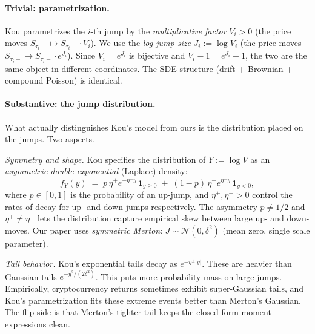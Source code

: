 \documentclass[11pt]{article}
\theoremstyle{definition}
\theoremstyle{remark}
\newcommand{\1}{\mathbf{1}}
\begin{document}
\paragraph{Trivial: parametrization.}
Kou parametrizes the $i$-th jump by the \emph{multiplicative factor} $V_i > 0$ (the price moves $S_{\tau_i-} \mapsto S_{\tau_i-} \cdot V_i$). We use the \emph{log-jump size} $J_i := \log V_i$ (the price moves $S_{\tau_i-} \mapsto S_{\tau_i-} \cdot e^{J_i}$). Since $V_i = e^{J_i}$ is bijective and $V_i - 1 = e^{J_i} - 1$, the two are the same object in different coordinates. The SDE structure (drift + Brownian + compound Poisson) is identical.

\paragraph{Substantive: the jump distribution.}
What actually distinguishes Kou's model from ours is the distribution placed on the jumps. Two aspects.

\emph{Symmetry and shape.} Kou specifies the distribution of $Y := \log V$ as an \emph{asymmetric double-exponential} (Laplace) density:
\[
f_Y(y) \;=\; p\,\eta^+ e^{-\eta^+ y}\,\mathbf{1}_{y \ge 0} \;+\; (1-p)\,\eta^- e^{\eta^- y}\,\mathbf{1}_{y < 0},
\]
where $p \in [0,1]$ is the probability of an up-jump, and $\eta^+, \eta^- > 0$ control the rates of decay for up- and down-jumps respectively. The asymmetry $p \neq 1/2$ and $\eta^+ \neq \eta^-$ lets the distribution capture empirical skew between large up- and down-moves. Our paper uses \emph{symmetric Merton}: $J \sim \mathcal{N}(0, \delta^2)$ (mean zero, single scale parameter).

\emph{Tail behavior.} Kou's exponential tails decay as $e^{-\eta^\pm |y|}$. These are heavier than Gaussian tails $e^{-y^2/(2\delta^2)}$. This puts more probability mass on large jumps. Empirically, cryptocurrency returns sometimes exhibit super-Gaussian tails, and Kou's parametrization fits these extreme events better than Merton's Gaussian. The flip side is that Merton's tighter tail keeps the closed-form moment expressions clean.
\end{document}
